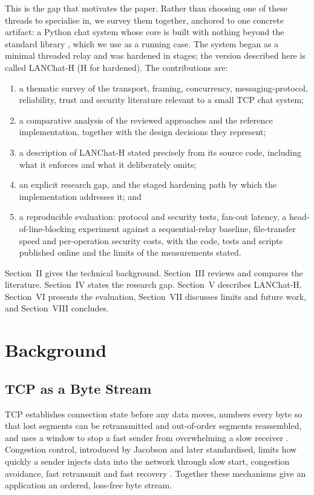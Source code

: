 \documentclass[conference]{IEEEtran}
\begin{document}
This is the gap that motivates the paper. Rather than choosing one of these threads to specialise in, we survey them together, anchored to one concrete artifact: a Python chat system whose core is built with nothing beyond the standard library \cite{pysocket,pythreading}, which we use as a running case. The system began as a minimal threaded relay and was hardened in stages; the version described here is called LANChat-H (H for hardened). The contributions are:
\begin{enumerate}
  \item a thematic survey of the transport, framing, concurrency, messaging-protocol, reliability, trust and security literature relevant to a small TCP chat system;
  \item a comparative analysis of the reviewed approaches and the reference implementation, together with the design decisions they represent;
  \item a description of LANChat-H stated precisely from its source code, including what it enforces and what it deliberately omits;
  \item an explicit research gap, and the staged hardening path by which the implementation addresses it; and
  \item a reproducible evaluation: protocol and security tests, fan-out latency, a head-of-line-blocking experiment against a sequential-relay baseline, file-transfer speed and per-operation security costs, with the code, tests and scripts published online \cite{lanchatrepo} and the limits of the measurements stated.
\end{enumerate}
Section~II gives the technical background. Section~III reviews and compares the literature. Section~IV states the research gap. Section~V describes LANChat-H. Section~VI presents the evaluation, Section~VII discusses limits and future work, and Section~VIII concludes.

\section{Background}

\subsection{TCP as a Byte Stream}
TCP establishes connection state before any data moves, numbers every byte so that lost segments can be retransmitted and out-of-order segments reassembled, and uses a window to stop a fast sender from overwhelming a slow receiver \cite{rfc793,rfc9293}. Congestion control, introduced by Jacobson and later standardised, limits how quickly a sender injects data into the network through slow start, congestion avoidance, fast retransmit and fast recovery \cite{jacobson,rfc5681}. Together these mechanisms give an application an ordered, loss-free byte stream.
\end{document}
